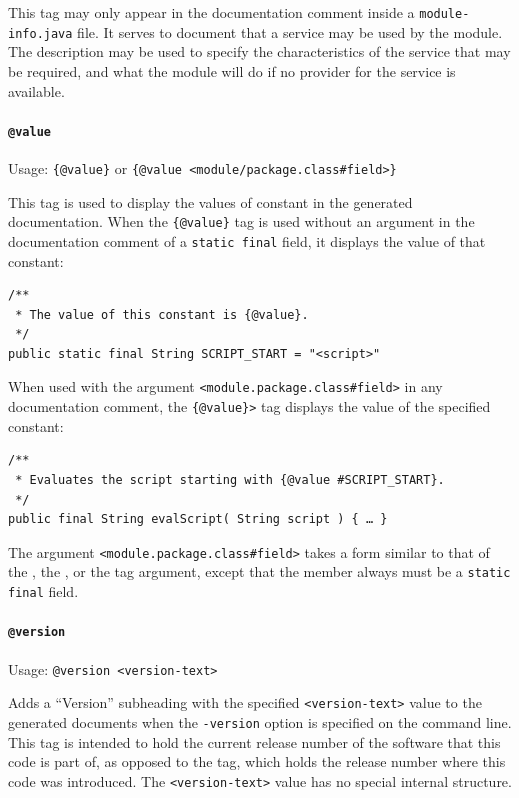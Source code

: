 \documentclass[11pt,a4paper, titlepage, parskip=half, headsepline, footsepline, cleardoublepage=current, headheight=1cm]{scrbook}
\begin{document}
This tag may only appear in the documentation comment inside a \verb#module-info.java# file. It serves to document that a service may be used by the module. The description may be used to specify the characteristics of the service that may be required, and what the module will do if no provider for the service is available.

\paragraph{\lstinline|@value|}\label{sec:TagValue}  Usage: \lstinline|{@value}| or \lstinline|{@value <module/package.class#field>}|

This tag is used to display the values of constant in the generated documentation. When the \lstinline|{@value}| tag is used without an argument in the documentation comment of a \lstinline|static final| field, it displays the value of that constant:
\begin{lstlisting}
/**
 * The value of this constant is {@value}.
 */
public static final String SCRIPT_START = "<script>"
\end{lstlisting}

When used with the argument \verb|<module.package.class#field>| in any documentation comment, the \lstinline|{@value}>| tag displays the value of the specified constant:
\begin{lstlisting}
/**
 * Evaluates the script starting with {@value #SCRIPT_START}.
 */
public final String evalScript( String script ) { … }
\end{lstlisting}
The argument \verb|<module.package.class#field>| takes a form similar to that of the , the , or the  tag argument, except that the member always must be a \lstinline|static final| field.

\paragraph{\lstinline|@version|}\label{sec:TagVersion}  Usage: \lstinline|@version <version-text>|

Adds a “Version” subheading with the specified \verb#<version-text># value to the generated documents when the \verb#-version# option is specified on the command line. This tag is intended to hold the current release number of the software that this code is part of, as opposed to the  tag, which holds the release number where this code was introduced. The \verb#<version-text># value has no special internal structure.
\end{document}
